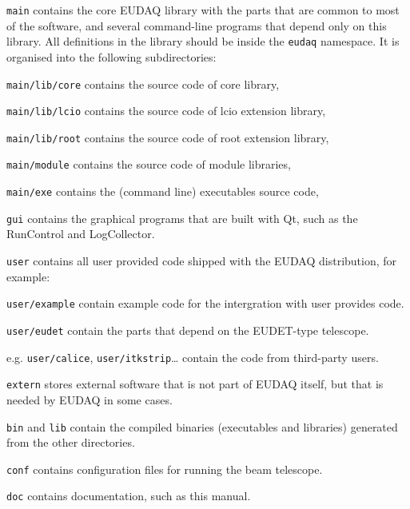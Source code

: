 \begin{myitemize}
\item \texttt{main}
  contains the core EUDAQ library with the parts that are common to most of the software,
  and several command-line programs that depend only on this library.
  All definitions in the library should be inside the \texttt{eudaq} namespace.
  It is organised into the following subdirectories:
  \begin{myitemize}
  \item \texttt{main/lib/core}
    contains the source code of core library,
  \item \texttt{main/lib/lcio}
    contains the source code of lcio extension library,
  \item \texttt{main/lib/root}
    contains the source code of root extension library,
  \item \texttt{main/module}
    contains the source code of module libraries,
  \item \texttt{main/exe}
    contains the (command line) executables source code,
  \end{myitemize}
\item \texttt{gui}
  contains the graphical programs that are built with Qt, such as the RunControl and LogCollector.
\item \texttt{user}
  contains all user provided code shipped with the EUDAQ
  distribution, for example:
  \begin{myitemize}
\item \texttt{user/example}
  contain example code for the intergration with user provides code.
\item \texttt{user/eudet}
  contain the parts that depend on the EUDET-type telescope.
\item e.g. \texttt{user/calice}, \texttt{user/itkstrip}\ldots{}
  contain the code from third-party users.
  \end{myitemize}
\item \texttt{extern}
  stores external software that is not part of EUDAQ itself, but that is needed by EUDAQ in some cases.
\item \texttt{bin} and \texttt{lib}
  contain the compiled binaries (executables and libraries) generated from the other directories.
\item \texttt{conf}
  contains configuration files for running the beam telescope.
\item \texttt{doc}
  contains documentation, such as this manual.
\end{myitemize}

